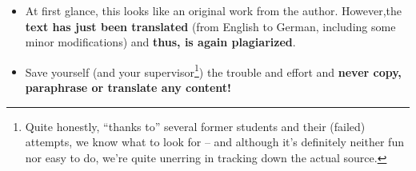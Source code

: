 \documentclass[11pt,a4paper]{article}
\begin{document}
\begin{badexample}
  \begin{figure}[H]
    \centering%
    {%
      \setlength{\fboxsep}{0pt}%
      \setlength{\fboxrule}{2pt}%
    }
  \end{figure}
  \begin{itemize}
    \item At first glance, this looks like an original work from the author.
    However,the \textbf{text has just been translated} (from English to German, including some minor modifications) and \textbf{thus, is again plagiarized}.
    \item Save yourself (and your supervisor\footnote{Quite honestly, ``thanks to'' several former students and their (failed) attempts, we know what to look for -- and although it's definitely neither fun nor easy to do, we're quite unerring in tracking down the actual source.}) the trouble and effort and \textbf{never copy, paraphrase or translate any content!}
  \end{itemize}
\end{badexample}
\end{document}

